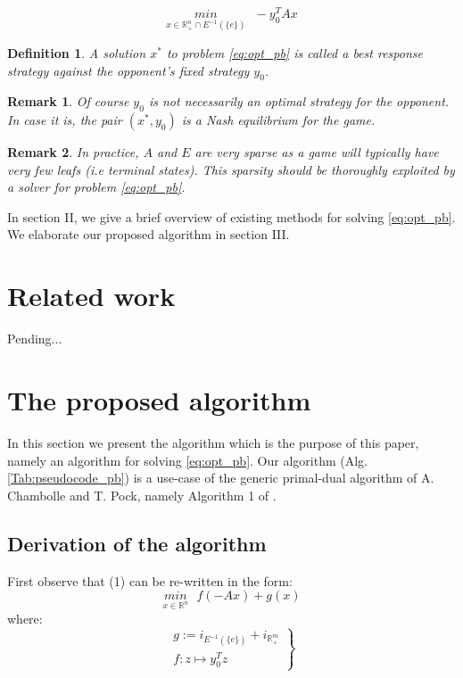 \documentclass[a4paper,10pt,journal]{IEEEtran}
\newtheorem{remark}{Remark}
\newtheorem{definition}[theorem]{Definition}
\begin{document}
\begin{equation}
  \underset{x \in \mathbb{R}_{+}^n \cap E^{-1}(\{e\})}{min}\text{ }-y_0^TAx
  \label{eq:opt_pb}
\end{equation}

\begin{definition}
A solution $x^*$ to problem \eqref{eq:opt_pb} is called a \textit{best response} strategy against the opponent's fixed strategy $y_0$.
\end{definition}

\begin{remark}
Of course $y_0$ is not necessarily an optimal strategy for the opponent. In case it is, the pair $(x^*, y_0)$ is a Nash equilibrium for the game.
\end{remark}

\begin{remark}
  In practice, $A$ and $E$ are very sparse as a game will typically have very few leafs
(i.e terminal states). This sparsity should be thoroughly exploited by a solver for problem \eqref{eq:opt_pb}.
\end{remark}

In section II, we give a brief overview of existing methods for solving \eqref{eq:opt_pb}.
We elaborate our proposed algorithm in section III.

\section{Related work}
Pending...

\section{The proposed algorithm}
\label{sec:algo}
In this section we present the algorithm which is the purpose of this paper, namely an algorithm
for solving \eqref{eq:opt_pb}. Our algorithm (Alg.\ref{Tab:pseudocode_pb}) is a use-case of
the generic primal-dual algorithm of A. Chambolle and T. Pock, namely Algorithm 1 of \cite{chambolle2010}.

\subsection{Derivation of the algorithm}
First observe that (1) can be re-written in the form:
\begin{equation}
  \underset{x \in \mathbb{R}^n}{min}\text{ }{f(-Ax) + g(x)}
\end{equation}
where:\\
\begin{equation}
  \left.
  \begin{aligned}
    g := i_{E^{-1}(\{e\})} + i_{\mathbb{R}_{+}^m}\\
    f: z \mapsto y_0^Tz
    \end{aligned}
  \right\}
\end{equation}
\end{document}
